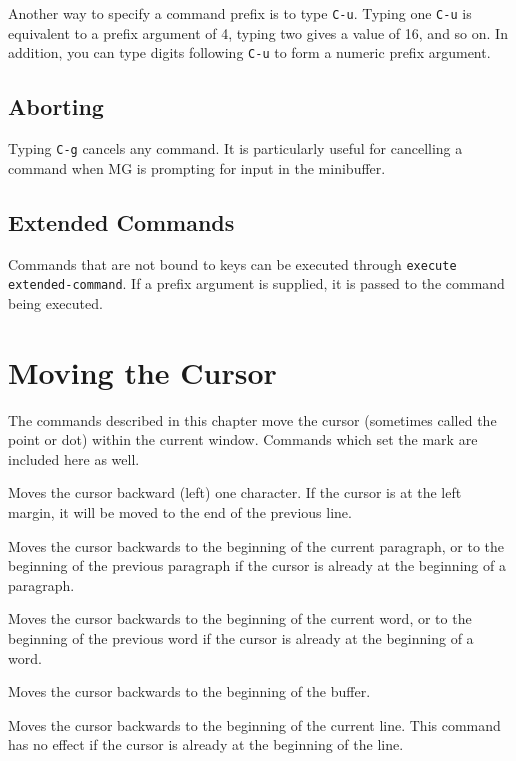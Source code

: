 \fbody Another way to specify a command prefix is to type {\tt C-u}.
Typing one {\tt C-u} is equivalent to a prefix argument of 4, typing
two gives a value of 16, and so on.  In addition, you can type digits
following {\tt C-u} to form a numeric prefix argument.

\section{Aborting}

\fbody Typing {\tt C-g} cancels any command.  It is particularly useful
for cancelling a command when MG is prompting for input in the minibuffer.

\section{Extended Commands}

\fbody Commands that are not bound to keys can be executed through 
{\tt execute extended-command}.  If a prefix argument is supplied, it
is passed to the command being executed.


\chapter{Moving the Cursor}

The commands described in this chapter move the cursor (sometimes
called the point or dot) within the current window.  Commands which
set the mark are included here as well.

\fbody Moves the cursor backward (left) one character.  If the cursor
is at the left margin, it will be moved to the end of the previous line.

\fname{backward-paragraph}{}{M-[}
\fbody Moves the cursor backwards to the beginning of the current
paragraph, or to the beginning of the previous paragraph if the cursor
is already at the beginning of a paragraph.

\fbody Moves the cursor backwards to the beginning of the current word,
or to the beginning of the previous word if the cursor is already at
the beginning of a word.

\fbody Moves the cursor backwards to the beginning of the buffer.

\fbody Moves the cursor backwards to the beginning of the current
line.  This command has no effect if the cursor is already at the beginning
of the line.

